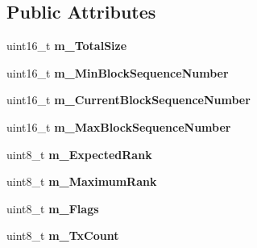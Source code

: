 \subsection*{Public Attributes}
\begin{DoxyCompactItemize}
\item 
uint16\+\_\+t {\bfseries m\+\_\+\+Total\+Size}\hypertarget{struct_network_coding_1_1_header_1_1_data_a0eee10996f4c999d5fa17105c376e619}{}\label{struct_network_coding_1_1_header_1_1_data_a0eee10996f4c999d5fa17105c376e619}

\item 
uint16\+\_\+t {\bfseries m\+\_\+\+Min\+Block\+Sequence\+Number}\hypertarget{struct_network_coding_1_1_header_1_1_data_aba45c425ef186557b1707e2071aae988}{}\label{struct_network_coding_1_1_header_1_1_data_aba45c425ef186557b1707e2071aae988}

\item 
uint16\+\_\+t {\bfseries m\+\_\+\+Current\+Block\+Sequence\+Number}\hypertarget{struct_network_coding_1_1_header_1_1_data_a771d12a3f6cf0651e0b89558cd50e4ec}{}\label{struct_network_coding_1_1_header_1_1_data_a771d12a3f6cf0651e0b89558cd50e4ec}

\item 
uint16\+\_\+t {\bfseries m\+\_\+\+Max\+Block\+Sequence\+Number}\hypertarget{struct_network_coding_1_1_header_1_1_data_adaa6e93aa9cf7b836f68d58dcb31ff2f}{}\label{struct_network_coding_1_1_header_1_1_data_adaa6e93aa9cf7b836f68d58dcb31ff2f}

\item 
uint8\+\_\+t {\bfseries m\+\_\+\+Expected\+Rank}\hypertarget{struct_network_coding_1_1_header_1_1_data_aef3bd9133fd1541c8a57bb4398a47685}{}\label{struct_network_coding_1_1_header_1_1_data_aef3bd9133fd1541c8a57bb4398a47685}

\item 
uint8\+\_\+t {\bfseries m\+\_\+\+Maximum\+Rank}\hypertarget{struct_network_coding_1_1_header_1_1_data_a6f01051deb4fadd59c404e76cc1fe186}{}\label{struct_network_coding_1_1_header_1_1_data_a6f01051deb4fadd59c404e76cc1fe186}

\item 
uint8\+\_\+t {\bfseries m\+\_\+\+Flags}\hypertarget{struct_network_coding_1_1_header_1_1_data_adf3d88f0abac9a055403c842249b34d3}{}\label{struct_network_coding_1_1_header_1_1_data_adf3d88f0abac9a055403c842249b34d3}

\item 
uint8\+\_\+t {\bfseries m\+\_\+\+Tx\+Count}\hypertarget{struct_network_coding_1_1_header_1_1_data_ab8f5cc8da3279a862b81ed883ac697cc}{}\label{struct_network_coding_1_1_header_1_1_data_ab8f5cc8da3279a862b81ed883ac697cc}


\end{DoxyCompactItemize}
